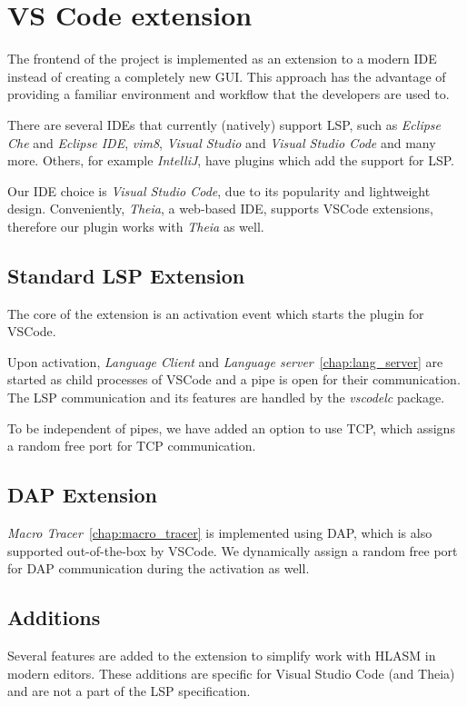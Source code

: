 \chapter{VS Code extension}

The frontend of the project is implemented as an extension to a modern IDE instead of creating a completely new GUI. This approach has the advantage of providing a familiar environment and workflow that the developers are used to.

There are several IDEs that currently (natively) support LSP, such as \emph{Eclipse Che} and \emph{Eclipse IDE}, \emph{vim8}, \emph{Visual Studio} and \emph{Visual Studio Code} and many more. Others, for example \emph{IntelliJ}, have plugins which add the support for LSP.

Our IDE choice is \emph{Visual Studio Code}, due to its popularity and lightweight design. Conveniently, \emph{Theia}, a web-based IDE, supports VSCode extensions, therefore our plugin works with \emph{Theia} as well.

\section{Standard LSP Extension}

The core of the extension is an activation event which starts the plugin for VSCode.

Upon activation, \emph{Language Client} and \emph{Language server}~\ref{chap:lang_server} are started as child processes of VSCode and a pipe is open for their communication. The LSP communication and its features are handled by the \emph{vscodelc} package. 

To be independent of pipes, we have added an option to use TCP, which assigns a random free port for TCP communication.

\section{DAP Extension}

\emph{Macro Tracer}~\ref{chap:macro_tracer} is implemented using DAP, which is also supported out-of-the-box by VSCode. We dynamically assign a random free port for DAP communication during the activation as well.

\section{Additions}

Several features are added to the extension to simplify work with HLASM in modern editors. These additions are specific for Visual Studio Code (and Theia) and are not a part of the LSP specification.


